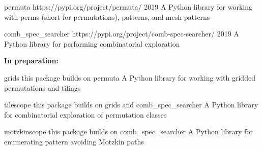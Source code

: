


\begin{cvhonors}

\cvhonor
  {permuta} %
  {{https://pypi.org/project/permuta/}} %
  {2019} %
  {A Python library for working with perms (short for permutations), patterns, and mesh patterns} %



\cvhonor
  {comb\_spec\_searcher} %
  {{https://pypi.org/project/comb-spec-searcher/}} %
  {2019} %
  {A Python library for performing combinatorial exploration} %


\begin{flushleft}
  \textbf{In preparation:}
\end{flushleft}


\cvhonor
  {grids} %
  {this package builds on permuta} %
  {} %
  {A Python library for working with gridded permutations and tilings} %



\cvhonor
  {tilescope} %
  {this package builds on grids and comb\_spec\_searcher} %
  {} %
  {A Python library for combinatorial exploration of permutation classes} %



\cvhonor
  {motzkinscope} %
  {this package builds on comb\_spec\_searcher} %
  {} %
  {A Python library for enumerating pattern avoiding Motzkin paths} %


\end{cvhonors}
